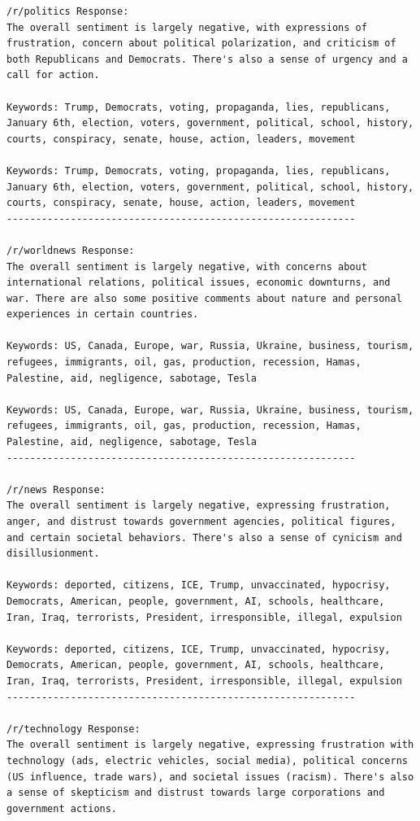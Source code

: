 \documentclass[
  12pt,
  letterpaper,
  DIV=11,
  numbers=noendperiod]{scrartcl}
\begin{document}
\begin{verbatim}
/r/politics Response:
The overall sentiment is largely negative, with expressions of frustration, concern about political polarization, and criticism of both Republicans and Democrats. There's also a sense of urgency and a call for action.

Keywords: Trump, Democrats, voting, propaganda, lies, republicans, January 6th, election, voters, government, political, school, history, courts, conspiracy, senate, house, action, leaders, movement

Keywords: Trump, Democrats, voting, propaganda, lies, republicans, January 6th, election, voters, government, political, school, history, courts, conspiracy, senate, house, action, leaders, movement
------------------------------------------------------------

/r/worldnews Response:
The overall sentiment is largely negative, with concerns about international relations, political issues, economic downturns, and war. There are also some positive comments about nature and personal experiences in certain countries.

Keywords: US, Canada, Europe, war, Russia, Ukraine, business, tourism, refugees, immigrants, oil, gas, production, recession, Hamas, Palestine, aid, negligence, sabotage, Tesla

Keywords: US, Canada, Europe, war, Russia, Ukraine, business, tourism, refugees, immigrants, oil, gas, production, recession, Hamas, Palestine, aid, negligence, sabotage, Tesla
------------------------------------------------------------

/r/news Response:
The overall sentiment is largely negative, expressing frustration, anger, and distrust towards government agencies, political figures, and certain societal behaviors. There's also a sense of cynicism and disillusionment.

Keywords: deported, citizens, ICE, Trump, unvaccinated, hypocrisy, Democrats, American, people, government, AI, schools, healthcare, Iran, Iraq, terrorists, President, irresponsible, illegal, expulsion

Keywords: deported, citizens, ICE, Trump, unvaccinated, hypocrisy, Democrats, American, people, government, AI, schools, healthcare, Iran, Iraq, terrorists, President, irresponsible, illegal, expulsion
------------------------------------------------------------

/r/technology Response:
The overall sentiment is largely negative, expressing frustration with technology (ads, electric vehicles, social media), political concerns (US influence, trade wars), and societal issues (racism). There's also a sense of skepticism and distrust towards large corporations and government actions.


\end{verbatim}
\end{document}
